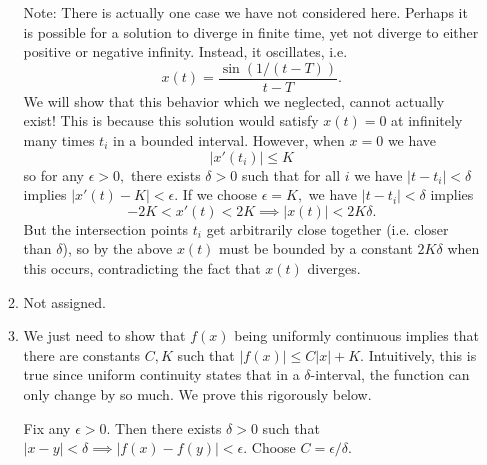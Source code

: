 \documentclass{article}
\numberwithin{equation}{section}
\begin{document}
\begin{enumerate}
\begin{enumerate}[label=(\alph*)]
        Note: There is actually one case we have not considered here. Perhaps it is possible for a solution to diverge in finite time, yet not diverge to either positive or negative infinity. Instead, it oscillates, i.e. 
        \begin{equation}
            x(t) = \frac{\sin(1/(t-T))}{t-T}.
        \end{equation}
        We will show that this behavior which we neglected, cannot actually exist! This is because this solution would satisfy $x(t)=0$ at infinitely many times $t_i$ in a bounded interval. However, when $x=0$ we have 
        \begin{equation}
            |x'(t_i)| \le K
        \end{equation}
        so for any $\epsilon > 0,$ there exists $\delta>0$ such that for all $i$ we have $|t-t_i|<\delta$ implies $|x'(t) - K| < \epsilon.$ If we choose $\epsilon = K,$ we have $|t-t_i|<\delta$ implies 
        \begin{equation}
            -2K < x'(t) < 2K \implies |x(t)| < 2K\delta.
        \end{equation}
        But the intersection points $t_i$ get arbitrarily close together (i.e. closer than $\delta$), so by the above $x(t)$ must be bounded by a constant $2K\delta$ when this occurs, contradicting the fact that $x(t)$ diverges.

        \item Not assigned.
        \item We just need to show that $f(x)$ being uniformly continuous implies that there are constants $C,K$ such that $|f(x)| \le C|x|+K.$ Intuitively, this is true since uniform continuity states that in a $\delta$-interval, the function can only change by so much. We prove this rigorously below.
        
        Fix any $\epsilon > 0.$ Then there exists $\delta > 0$ such that $|x-y|<\delta \implies |f(x)-f(y)|<\epsilon.$ Choose $C = \epsilon/\delta.$
        

\end{enumerate}
\end{enumerate}
\end{document}
